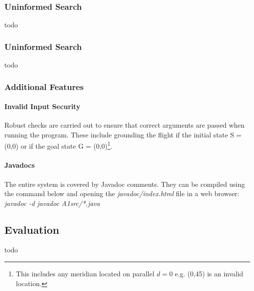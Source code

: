 \documentclass[letterpaper,12pt]{article}
\begin{document}

\subsubsection{Uninformed Search}

todo


\subsubsection{Uninformed Search}

todo


\subsubsection{Additional Features}

\paragraph{Invalid Input Security} Robust checks are carried out to ensure that correct arguments are passed when running the program. These include grounding the flight if the initial state S = (0,0) or if the goal state G = (0,0)\footnote{This includes any meridian located on parallel $d=0$ e.g. (0,45) is an invalid location.}.

\paragraph{Javadocs} The entire system is covered by Javadoc \cite{javadoc} comments. They can be compiled using the command below and opening the \textit{javadoc/index.html} file in a web browser:\\

\textit{javadoc -d javadoc A1src/*.java}


\subsection{Evaluation}

todo

\end{document}
